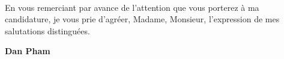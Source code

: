\documentclass[11pt]{article}
\begin{document}
\paragraph{}
En vous remerciant par avance de l'attention que vous porterez à ma candidature, je vous prie d’agréer, Madame, Monsieur, l’expression de mes salutations distinguées.\\[3em]
\begin{flushright}
\begin{minipage}[t]{.4\textwidth}
{\bfseries Dan Pham}\\
\end{minipage}\\
\end{flushright}

\vfill%
\end{document}
